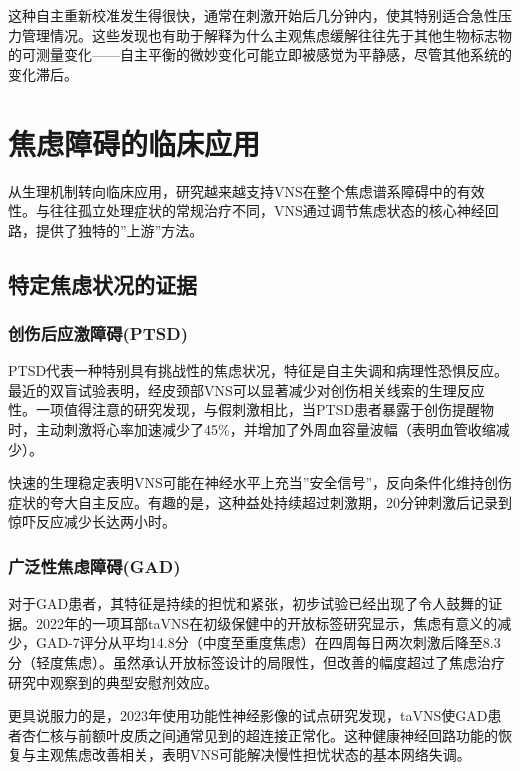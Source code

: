 \documentclass[
  Letterpaper,
]{scrbook}
\begin{document}
这种自主重新校准发生得很快，通常在刺激开始后几分钟内，使其特别适合急性压力管理情况。这些发现也有助于解释为什么主观焦虑缓解往往先于其他生物标志物的可测量变化------自主平衡的微妙变化可能立即被感觉为平静感，尽管其他系统的变化滞后。

\section{焦虑障碍的临床应用}\label{ux7126ux8651ux969cux788dux7684ux4e34ux5e8aux5e94ux7528}

从生理机制转向临床应用，研究越来越支持VNS在整个焦虑谱系障碍中的有效性。与往往孤立处理症状的常规治疗不同，VNS通过调节焦虑状态的核心神经回路，提供了独特的''上游''方法。

\subsection{特定焦虑状况的证据}\label{ux7279ux5b9aux7126ux8651ux72b6ux51b5ux7684ux8bc1ux636e}

\subsubsection{创伤后应激障碍(PTSD)}\label{ux521bux4f24ux540eux5e94ux6fc0ux969cux788dptsd}

PTSD代表一种特别具有挑战性的焦虑状况，特征是自主失调和病理性恐惧反应。最近的双盲试验表明，经皮颈部VNS可以显著减少对创伤相关线索的生理反应性。一项值得注意的研究发现，与假刺激相比，当PTSD患者暴露于创伤提醒物时，主动刺激将心率加速减少了45\%，并增加了外周血容量波幅（表明血管收缩减少）。

快速的生理稳定表明VNS可能在神经水平上充当''安全信号''，反向条件化维持创伤症状的夸大自主反应。有趣的是，这种益处持续超过刺激期，20分钟刺激后记录到惊吓反应减少长达两小时。

\subsubsection{广泛性焦虑障碍(GAD)}\label{ux5e7fux6cdbux6027ux7126ux8651ux969cux788dgad}

对于GAD患者，其特征是持续的担忧和紧张，初步试验已经出现了令人鼓舞的证据。2022年的一项耳部taVNS在初级保健中的开放标签研究显示，焦虑有意义的减少，GAD-7评分从平均14.8分（中度至重度焦虑）在四周每日两次刺激后降至8.3分（轻度焦虑）。虽然承认开放标签设计的局限性，但改善的幅度超过了焦虑治疗研究中观察到的典型安慰剂效应。

更具说服力的是，2023年使用功能性神经影像的试点研究发现，taVNS使GAD患者杏仁核与前额叶皮质之间通常见到的超连接正常化。这种健康神经回路功能的恢复与主观焦虑改善相关，表明VNS可能解决慢性担忧状态的基本网络失调。
\end{document}

